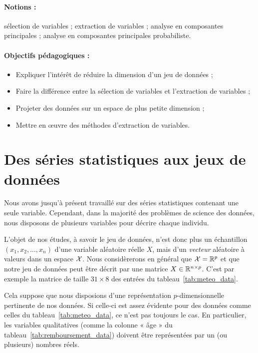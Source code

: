 \label{chap:dimred}

\paragraph{Notions :} sélection de variables ; extraction de variables ;
 analyse en composantes principales ; analyse en composantes principales probabiliste.
\paragraph{Objectifs pédagogiques :} 
\begin{itemize}      
  \setlength{\itemsep}{3pt}
\item Expliquer l'intérêt de réduire la dimension d'un jeu de données ;
\item Faire la différence entre la sélection de variables et l'extraction de variables ;
\item Projeter des données sur un espace de plus petite dimension ;%
\item Mettre en \oe{}uvre des méthodes d'extraction de variables.
\end{itemize}

\section{Des séries statistiques aux jeux de données}
Nous avons jusqu'à présent travaillé sur des séries statistiques contenant une
seule variable. Cependant, dans la majorité des problèmes de science des
données, nous disposons de plusieurs variables pour décrire chaque individu.

L'objet de nos études, à savoir le jeu de données, n'est donc plus un
échantillon $(x_1, x_2, \dots, x_n)$ d'une variable aléatoire réelle $X$, mais
d'un \textit{vecteur} aléatoire à valeurs dans un espace $\mathcal{X}$. Nous
considèrerons en général que $\mathcal{X} = \mathbb{R}^p$ et que notre jeu de données peut
être décrit par une matrice $X \in \mathbb{R}^{n \times p}$.  C'est par exemple la
matrice de taille $31 \times 8$ des entrées du tableau~\ref{tab:meteo_data}.

Cela suppose que nous disposions d'une représentation $p$-dimensionnelle
pertinente de nos données. Si celle-ci est assez évidente pour des données
comme celles du tableau~\ref{tab:meteo_data}, ce n'est pas toujours le cas. En
particulier, les variables qualitatives (comme la colonne « âge » du
tableau~\ref{tab:remboursement_data}) doivent être représentées par un (ou
plusieurs) nombres réels. 

